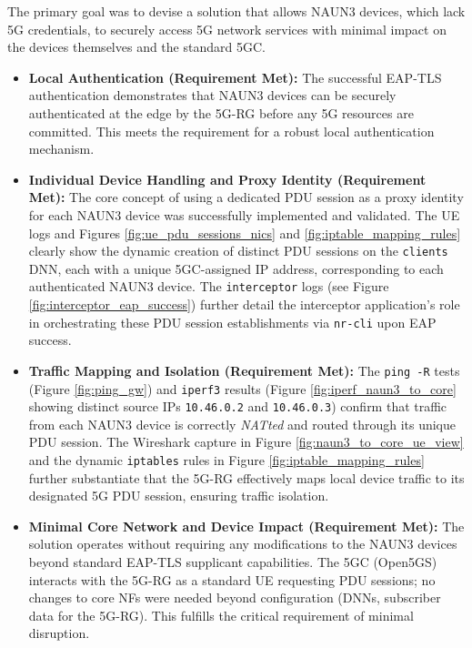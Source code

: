 The primary goal was to devise a solution that allows \ac{NAUN3} devices, which lack \ac{5G} credentials, to securely access \ac{5G} network services with minimal impact on the devices themselves and the standard \ac{5GC}.

\begin{itemize}
    \item \textbf{Local Authentication (Requirement Met):} The successful \ac{EAP-TLS} authentication demonstrates that \ac{NAUN3} devices can be securely authenticated at the edge by the \ac{5G-RG} before any \ac{5G} resources are committed. This meets the requirement for a robust local authentication mechanism.

    \item \textbf{Individual Device Handling and Proxy Identity (Requirement Met):} The core concept of using a dedicated \ac{PDU} session as a proxy identity for each \ac{NAUN3} device was successfully implemented and validated. The \ac{UE} logs and Figures \ref{fig:ue_pdu_sessions_nics} and \ref{fig:iptable_mapping_rules} clearly show the dynamic creation of distinct \ac{PDU} sessions on the \texttt{clients} \ac{DNN}, each with a unique \ac{5GC}-assigned \ac{IP} address, corresponding to each authenticated \ac{NAUN3} device. The \texttt{interceptor} logs (see Figure \ref{fig:interceptor_eap_success}) further detail the interceptor application's role in orchestrating these \ac{PDU} session establishments via \texttt{nr-cli} upon \ac{EAP} success.

    \item \textbf{Traffic Mapping and Isolation (Requirement Met):} The \texttt{ping -R} tests (Figure \ref{fig:ping_gw}) and \texttt{iperf3} results (Figure \ref{fig:iperf_naun3_to_core} showing distinct source \acp{IP} \texttt{10.46.0.2} and \texttt{10.46.0.3}) confirm that traffic from each \ac{NAUN3} device is correctly \textit{NATted} and routed through its unique \ac{PDU} session. The Wireshark capture in Figure \ref{fig:naun3_to_core_ue_view} and the dynamic \texttt{iptables} rules in Figure \ref{fig:iptable_mapping_rules} further substantiate that the \ac{5G-RG} effectively maps local device traffic to its designated \ac{5G} \ac{PDU} session, ensuring traffic isolation.

    \item \textbf{Minimal Core Network and Device Impact (Requirement Met):} The solution operates without requiring any modifications to the \ac{NAUN3} devices beyond standard \ac{EAP-TLS} supplicant capabilities. The \ac{5GC} (Open5GS) interacts with the \ac{5G-RG} as a standard \ac{UE} requesting \ac{PDU} sessions; no changes to core \acp{NF} were needed beyond configuration (\acp{DNN}, subscriber data for the \ac{5G-RG}). This fulfills the critical requirement of minimal disruption.


\end{itemize}
